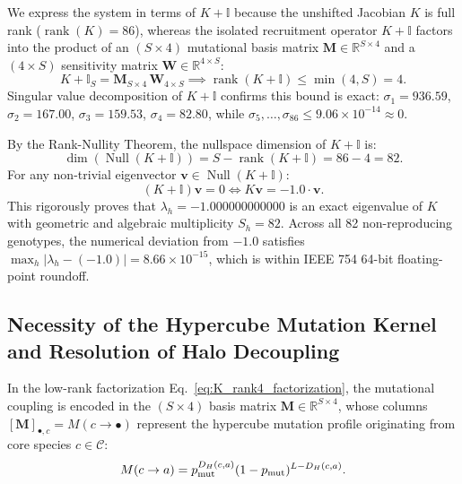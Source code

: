 \documentclass[11pt,a4paper]{article}
\newcommand{\pmut}{p_{\rm mut}}
\begin{document}
We express the system in terms of $K + \mathbb{I}$ because the unshifted Jacobian $K$ is full rank ($\operatorname{rank}(K) = 86$), whereas the isolated recruitment operator $K + \mathbb{I}$ factors into the product of an $(S \times 4)$ mutational basis matrix $\mathbf{M} \in \mathbb{R}^{S \times 4}$ and a $(4 \times S)$ sensitivity matrix $\mathbf{W} \in \mathbb{R}^{4 \times S}$:
\begin{equation}
K + \mathbb{I}_{S} = \mathbf{M}_{S \times 4} \, \mathbf{W}_{4 \times S} \implies \operatorname{rank}(K + \mathbb{I}) \le \min(4, S) = 4.
\label{eq:rank_bound}
\end{equation}
Singular value decomposition of $K + \mathbb{I}$ confirms this bound is exact: $\sigma_1 = 936.59$, $\sigma_2 = 167.00$, $\sigma_3 = 159.53$, $\sigma_4 = 82.80$, while $\sigma_5, \dots, \sigma_{86} \le 9.06 \times 10^{-14} \approx 0$. 

By the Rank-Nullity Theorem, the nullspace dimension of $K + \mathbb{I}$ is:
\begin{equation}
\dim(\operatorname{Null}(K + \mathbb{I})) = S - \operatorname{rank}(K + \mathbb{I}) = 86 - 4 = 82.
\end{equation}
For any non-trivial eigenvector $\mathbf{v} \in \operatorname{Null}(K + \mathbb{I})$:
\begin{equation}
(K + \mathbb{I})\mathbf{v} = 0 \iff K \mathbf{v} = -1.0 \cdot \mathbf{v}.
\end{equation}
This rigorously proves that $\lambda_h = -1.000000000000$ is an exact eigenvalue of $K$ with geometric and algebraic multiplicity $S_h = 82$. Across all 82 non-reproducing genotypes, the numerical deviation from $-1.0$ satisfies $\max_h |\lambda_h - (-1.0)| = 8.66 \times 10^{-15}$, which is within IEEE 754 64-bit floating-point roundoff.

\subsection{Necessity of the Hypercube Mutation Kernel and Resolution of Halo Decoupling}
\label{sec:mutation_necessity}

In the low-rank factorization Eq.~\eqref{eq:K_rank4_factorization}, the mutational coupling is encoded in the $(S \times 4)$ basis matrix $\mathbf{M} \in \mathbb{R}^{S \times 4}$, whose columns $[\mathbf{M}]_{\bullet, c} = M(c \to \bullet)$ represent the hypercube mutation profile originating from core species $c \in \mathcal{C}$:
\begin{equation}
M(c \to a) = \pmut^{D_H(c,a)} (1 - \pmut)^{L - D_H(c,a)}.
\label{eq:M_kernel_supp}
\end{equation}
\end{document}
